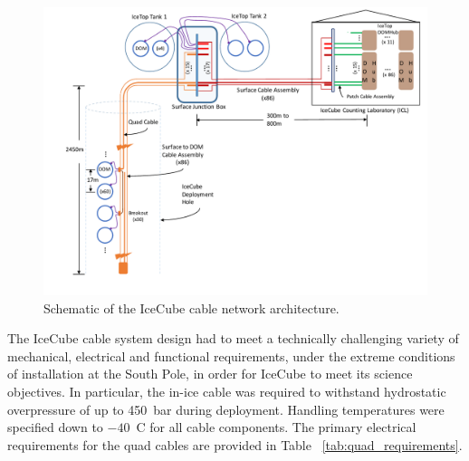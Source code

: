 \begin{figure}
  \centering
  \includegraphics[width=\textwidth]{graphics/cables/cable_system_schematic.pdf}
  \caption{\label{fig:icecube-cables-logical}Schematic of the IceCube cable network architecture.}
\end{figure}

The IceCube cable system design had to meet a technically challenging
variety of mechanical, electrical and functional requirements, under the extreme
conditions of installation at the South Pole, in order for
IceCube to meet its science objectives.  In particular, the in-ice cable
was required to withstand hydrostatic overpressure of up to 450~bar during
deployment.  Handling temperatures were specified down to $-40$~C for all 
cable components.  The primary electrical requirements for the quad
cables are provided in Table ~\ref{tab:quad_requirements}.


